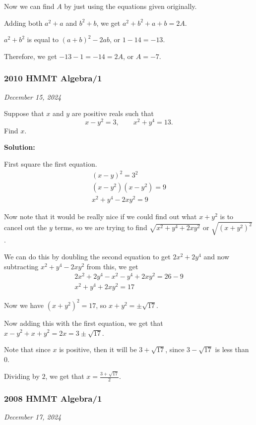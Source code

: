 \documentclass[../mathproblems.tex]{subfiles}
\begin{document}
Now we can find $A$ by just using the equations given originally.

Adding both $a^2+a$ and $b^2+b$, we get $a^2+b^2+a+b=2A$.

$a^2+b^2$ is equal to $(a+b)^2-2ab$, or $1-14 = -13$.

Therefore, we get $-13-1=-14 = 2A$, or $A=\boxed{-7}$.

\noindent\hrulefill

\subsubsection*{2010 HMMT Algebra/1}
\textit{December 15, 2024}

Suppose that $x$ and $y$ are positive reals such that \[x-y^2=3, \qquad x^2+y^4=13.\] Find $x$.

\textbf{Solution:}

First square the first equation.
\begin{align*}
(x-y)^2 = 3^2 \\
(x-y^2)(x-y^2) = 9\\
x^2+y^4-2xy^2=9
\end{align*}

Now note that it would be really nice if we could find out what $x+y^2$ is to cancel out the $y$ terms, so we are trying to find $\sqrt{x^2+y^4+2xy^2}$ or $\sqrt{(x+y^2)^2}$.

We can do this by doubling the second equation to get $2x^2+2y^4$ and now subtracting $x^2+y^4-2xy^2$ from this, we get 
\begin{align*}
2x^2+2y^4-x^2-y^4+2xy^2 = 26-9\\
x^2+y^4+2xy^2=17
\end{align*}

Now we have $(x+y^2)^2 = 17$, so $x+y^2 = \pm\sqrt{17}$.

Now adding this with the first equation, we get that $x-y^2+x+y^2 = 2x = 3\pm\sqrt{17}$.

Note that since $x$ is positive, then it will be $3+\sqrt{17}$, since $3-\sqrt{17}$ is less than $0$.

Dividing by $2$, we get that $x=\boxed{\frac{3+\sqrt{17}}{2}}$.

\noindent\hrulefill

\subsubsection*{2008 HMMT Algebra/1}
\textit{December 17, 2024}
\end{document}
